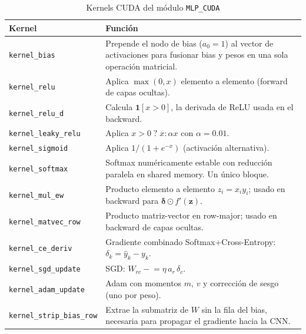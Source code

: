 \documentclass[12pt,a4paper]{article}
\begin{document}
\begin{table}[H]
\centering
\caption{Kernels CUDA del módulo \texttt{MLP\_CUDA}}
\label{tab:kernels}
\begin{tabular}{lp{9cm}}
\toprule
\textbf{Kernel}                   & \textbf{Función} \\
\midrule
\texttt{kernel\_bias}             & Prepende el nodo de bias ($a_0 = 1$) al
                                    vector de activaciones para fusionar bias
                                    y pesos en una sola operación matricial. \\
\texttt{kernel\_relu}             & Aplica $\max(0, x)$ elemento a elemento
                                    (forward de capas ocultas). \\
\texttt{kernel\_relu\_d}          & Calcula $\mathbf{1}[x > 0]$, la derivada
                                    de ReLU usada en el backward. \\
\texttt{kernel\_leaky\_relu}      & Aplica $x > 0 \;?\; x : \alpha x$
                                    con $\alpha = 0.01$. \\
\texttt{kernel\_sigmoid}          & Aplica $1/(1+e^{-x})$ (activación alternativa). \\
\texttt{kernel\_softmax}          & Softmax numéricamente estable con reducción
                                    paralela en shared memory. Un único bloque. \\
\texttt{kernel\_mul\_ew}          & Producto elemento a elemento $z_i = x_i y_i$;
                                    usado en backward para $\boldsymbol{\delta}
                                    \odot f'(\mathbf{z})$. \\
\texttt{kernel\_matvec\_row}      & Producto matriz-vector en row-major;
                                    usado en backward de capas ocultas. \\
\texttt{kernel\_ce\_deriv}        & Gradiente combinado Softmax+Cross-Entropy:
                                    $\delta_k = \hat{y}_k - y_k$. \\
\texttt{kernel\_sgd\_update}      & SGD: $W_{rc} \mathrel{-}= \eta\,a_r\,\delta_c$. \\
\texttt{kernel\_adam\_update}     & Adam con momentos $m$, $v$ y corrección de
                                    sesgo (uno por peso). \\
\texttt{kernel\_strip\_bias\_row} & Extrae la submatriz de $W$ sin la fila del bias,
                                    necesaria para propagar el gradiente hacia la CNN. \\
\bottomrule
\end{tabular}
\end{table}
\end{document}
